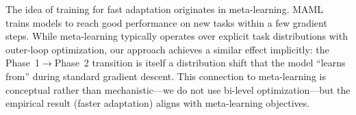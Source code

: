 The idea of training for fast adaptation originates in meta-learning. MAML~\cite{finn2017maml} trains models to reach good performance on new tasks within a few gradient steps. While meta-learning typically operates over explicit task distributions with outer-loop optimization, our approach achieves a similar effect implicitly: the Phase~1$\to$Phase~2 transition is itself a distribution shift that the model ``learns from'' during standard gradient descent. This connection to meta-learning is conceptual rather than mechanistic---we do not use bi-level optimization---but the empirical result (faster adaptation) aligns with meta-learning objectives.

